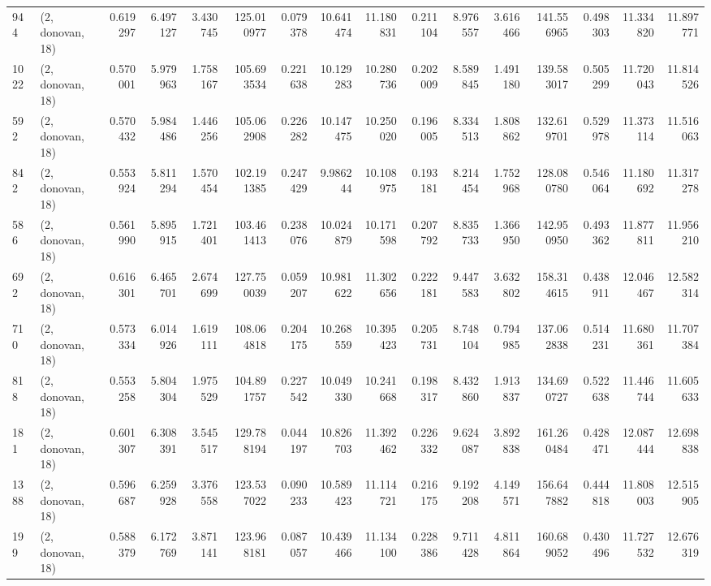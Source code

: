 \begin{tabular}{llrrrrrrrrrrrrrr}
944  &  (2, donovan, 18) &   0.619297 &   6.497127 &   3.430745 &    125.010977 &    0.079378 &   10.641474 &   11.180831 &  0.211104 &   8.976557 &   3.616466 &   141.556965 &   0.498303 &  11.334820 &  11.897771 \\
1022 &  (2, donovan, 18) &   0.570001 &   5.979963 &   1.758167 &    105.693534 &    0.221638 &   10.129283 &   10.280736 &  0.202009 &   8.589845 &   1.491180 &   139.583017 &   0.505299 &  11.720043 &  11.814526 \\
592  &  (2, donovan, 18) &   0.570432 &   5.984486 &   1.446256 &    105.062908 &    0.226282 &   10.147475 &   10.250020 &  0.196005 &   8.334513 &   1.808862 &   132.619701 &   0.529978 &  11.373114 &  11.516063 \\
842  &  (2, donovan, 18) &   0.553924 &   5.811294 &   1.570454 &    102.191385 &    0.247429 &    9.986244 &   10.108975 &  0.193181 &   8.214454 &   1.752968 &   128.080780 &   0.546064 &  11.180692 &  11.317278 \\
586  &  (2, donovan, 18) &   0.561990 &   5.895915 &   1.721401 &    103.461413 &    0.238076 &   10.024879 &   10.171598 &  0.207792 &   8.835733 &   1.366950 &   142.950950 &   0.493362 &  11.877811 &  11.956210 \\
692  &  (2, donovan, 18) &   0.616301 &   6.465701 &   2.674699 &    127.750039 &    0.059207 &   10.981622 &   11.302656 &  0.222181 &   9.447583 &   3.632802 &   158.314615 &   0.438911 &  12.046467 &  12.582314 \\
710  &  (2, donovan, 18) &   0.573334 &   6.014926 &   1.619111 &    108.064818 &    0.204175 &   10.268559 &   10.395423 &  0.205731 &   8.748104 &   0.794985 &   137.062838 &   0.514231 &  11.680361 &  11.707384 \\
818  &  (2, donovan, 18) &   0.553258 &   5.804304 &   1.975529 &    104.891757 &    0.227542 &   10.049330 &   10.241668 &  0.198317 &   8.432860 &   1.913837 &   134.690727 &   0.522638 &  11.446744 &  11.605633 \\
181  &  (2, donovan, 18) &   0.601307 &   6.308391 &   3.545517 &    129.788194 &    0.044197 &   10.826703 &   11.392462 &  0.226332 &   9.624087 &   3.892838 &   161.260484 &   0.428471 &  12.087444 &  12.698838 \\
1388 &  (2, donovan, 18) &   0.596687 &   6.259928 &   3.376558 &    123.537022 &    0.090233 &   10.589423 &   11.114721 &  0.216175 &   9.192208 &   4.149571 &   156.647882 &   0.444818 &  11.808003 &  12.515905 \\
199  &  (2, donovan, 18) &   0.588379 &   6.172769 &   3.871141 &    123.968181 &    0.087057 &   10.439466 &   11.134100 &  0.228386 &   9.711428 &   4.811864 &   160.689052 &   0.430496 &  11.727532 &  12.676319 \\

\end{tabular}
